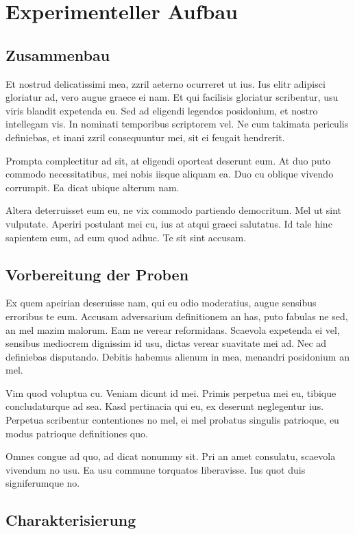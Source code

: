 \documentclass[11pt,twoside,german]{book}
\begin{document}
\chapter{Experimenteller Aufbau}
\section{Zusammenbau}

Et nostrud delicatissimi mea, zzril aeterno ocurreret ut ius. Ius elitr adipisci gloriatur ad, vero augue graece ei nam. Et qui facilisis gloriatur scribentur, usu viris blandit expetenda eu. Sed ad eligendi legendos posidonium, et nostro intellegam vis. In nominati temporibus scriptorem vel. Ne cum takimata periculis definiebas, et inani zzril consequuntur mei, sit ei feugait hendrerit.

Prompta complectitur ad sit, at eligendi oporteat deserunt eum. At duo puto commodo necessitatibus, mei nobis iisque aliquam ea. Duo cu oblique vivendo corrumpit. Ea dicat ubique alterum nam.

Altera deterruisset eum eu, ne vix commodo partiendo democritum. Mel ut sint vulputate. Aperiri postulant mei cu, ius at atqui graeci salutatus. Id tale hinc sapientem eum, ad eum quod adhuc. Te sit sint accusam.

\section{Vorbereitung der Proben}

Ex quem apeirian deseruisse nam, qui eu odio moderatius, augue sensibus erroribus te eum. Accusam adversarium definitionem an has, puto fabulas ne sed, an mel mazim malorum. Eam ne verear reformidans. Scaevola expetenda ei vel, sensibus mediocrem dignissim id usu, dictas verear suavitate mei ad. Nec ad definiebas disputando. Debitis habemus alienum in mea, menandri posidonium an mel.

Vim quod voluptua cu. Veniam dicunt id mei. Primis perpetua mei eu, tibique concludaturque ad sea. Kasd pertinacia qui eu, ex deserunt neglegentur ius. Perpetua scribentur contentiones no mel, ei mel probatus singulis patrioque, eu modus patrioque definitiones quo.

Omnes congue ad quo, ad dicat nonummy sit. Pri an amet consulatu, scaevola vivendum no usu. Ea usu commune torquatos liberavisse. Ius quot duis signiferumque no.

\section{Charakterisierung}
\end{document}
